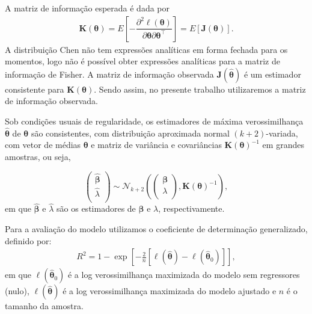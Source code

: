 \documentclass{sciposter}
\begin{document}
\begin{multicols*}{2}
{%

A matriz de informação esperada é dada por 
\begin{align*}
\bm{K}(\bm{\theta})=E\left[ - \dfrac{\partial^2 \ell(\bm{\theta})}{\partial\bm{\theta} \partial\bm{\theta}^{\top}}\right] = E[\bm{J}(\bm{\theta})].
\end{align*}
A distribuição Chen não tem expressões analíticas em forma fechada para os momentos, logo não é possível obter expressões analíticas para a matriz de informação de Fisher. A matriz de informação observada $\bm{J}(\widehat{\bm{\theta}})$ é um estimador consistente para $\bm{K}(\bm{\theta})$. Sendo assim, no presente trabalho utilizaremos a matriz de informação observada.

Sob condições usuais de regularidade, os estimadores de máxima verossimilhança  $\widehat{\bm{\theta}}$ de $\bm{\theta}$ são  consistentes, com distribuição aproximada normal $(k+2)$-variada, com vetor de médias $\bm{\theta}$ e matriz de variância e covariâncias  $\bm{K}(\bm{\theta})^{-1}$ em grandes amostras, ou seja,

\begin{equation*} \label{assint}
\left(\begin{array}{c} 
\widehat{\bm{\beta}} \\
\widehat{{\lambda}} \\
\end{array} \right ) \sim \mathcal{N}_{k+2}    \left( \left(\begin{array}{c} 
\bm{\beta} \\ 
\lambda \\
\end{array} \right ), \boldsymbol{K} (\boldsymbol{\theta})^{-1} \right ),
\end{equation*}
em que $\widehat{\bm{\beta}}$ e $\widehat{\lambda}$ são os estimadores de $\bm{\beta}$ e $\lambda$, respectivamente.
\vspace{0.2cm}

Para a avaliação do modelo utilizamos o coeficiente de determinação generalizado, definido por:
\begin{align}\label{r2}
R^2= 1 - \exp\left[ - \frac{2}{n} \left[ \ell(\widehat{\bm{\theta}}) -\ell(\widehat{\bm{\theta}}_0) \right] \right],
\end{align}
em que $\ell(\widehat{\bm{\theta}}_0)$ é a log verossimilhança maximizada do modelo sem regressores (nulo), $\ell(\widehat{\bm{\theta}})$  é a log verossimilhança maximizada do modelo ajustado e $n$ é o tamanho da amostra.

}
\end{multicols*}
\end{document}
